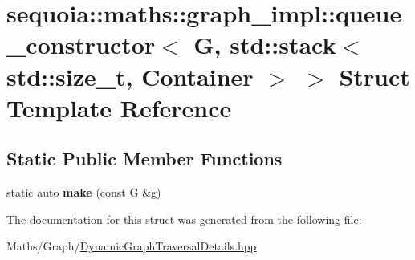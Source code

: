 \hypertarget{structsequoia_1_1maths_1_1graph__impl_1_1queue__constructor_3_01_g_00_01std_1_1stack_3_01std_1_102eef40b6c175484b646e61ce3cb3a52}{}\section{sequoia\+::maths\+::graph\+\_\+impl\+::queue\+\_\+constructor$<$ G, std\+::stack$<$ std\+::size\+\_\+t, Container $>$ $>$ Struct Template Reference}
\label{structsequoia_1_1maths_1_1graph__impl_1_1queue__constructor_3_01_g_00_01std_1_1stack_3_01std_1_102eef40b6c175484b646e61ce3cb3a52}
\subsection*{Static Public Member Functions}
\begin{DoxyCompactItemize}
\item 
\mbox{\label{structsequoia_1_1maths_1_1graph__impl_1_1queue__constructor_3_01_g_00_01std_1_1stack_3_01std_1_102eef40b6c175484b646e61ce3cb3a52_a438c23d4cc0d7ec60bcba2139bf46ce4}} 
static auto {\bfseries make} (const G \&g)
\end{DoxyCompactItemize}


The documentation for this struct was generated from the following file\+:\begin{DoxyCompactItemize}
\item 
Maths/\+Graph/\mbox{\hyperlink{_dynamic_graph_traversal_details_8hpp}{Dynamic\+Graph\+Traversal\+Details.\+hpp}}\end{DoxyCompactItemize}
